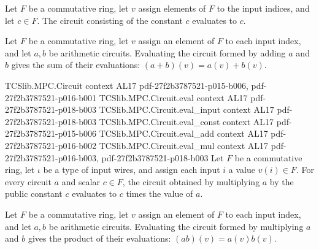 \begin{theorem}
\label{TCSlib.MPC.Circuit.eval_const}
\leanok
{}
Let $F$ be a commutative ring, let $v$ assign elements of $F$ to the input indices, and
let $c\in F$. The circuit consisting of the constant $c$ evaluates to $c$.
\end{theorem}

\begin{theorem}
\label{TCSlib.MPC.Circuit.eval_add}
\leanok
{}
Let $F$ be a commutative ring, let $v$ assign an element of $F$ to each input index, and
let $a,b$ be arithmetic circuits. Evaluating the circuit formed by adding $a$ and $b$
gives the sum of their evaluations: $(a+b)(v)=a(v)+b(v)$.
\end{theorem}

\begin{theorem}
\label{TCSlib.MPC.Circuit.eval_smul}
\leanok
\proofstep
  {TCSlib.MPC.Circuit}
  {context}
  {AL17}
  {pdf-27f2b3787521-p015-b006,
    pdf-27f2b3787521-p016-b001}
\proofstep
  {TCSlib.MPC.Circuit.eval}
  {context}
  {AL17}
  {pdf-27f2b3787521-p018-b003}
\proofstep
  {TCSlib.MPC.Circuit.eval_input}
  {context}
  {AL17}
  {pdf-27f2b3787521-p018-b003}
\proofstep
  {TCSlib.MPC.Circuit.eval_const}
  {context}
  {AL17}
  {pdf-27f2b3787521-p015-b006}
\proofstep
  {TCSlib.MPC.Circuit.eval_add}
  {context}
  {AL17}
  {pdf-27f2b3787521-p016-b002}
\proofstep
  {TCSlib.MPC.Circuit.eval_mul}
  {context}
  {AL17}
  {pdf-27f2b3787521-p016-b003,
    pdf-27f2b3787521-p018-b003}
Let $F$ be a commutative ring, let $\iota$ be a type of input wires, and assign each
input $i$ a value $v(i)\in F$. For every circuit $a$ and scalar $c\in F$, the circuit
obtained by multiplying $a$ by the public constant $c$ evaluates to $c$ times the value
of $a$.
\end{theorem}

\begin{theorem}
\label{TCSlib.MPC.Circuit.eval_mul}
\leanok
{}
Let $F$ be a commutative ring, let $v$ assign an element of $F$ to each input index, and
let $a,b$ be arithmetic circuits. Evaluating the circuit formed by multiplying $a$ and
$b$ gives the product of their evaluations: $(ab)(v)=a(v)b(v)$.
\end{theorem}

